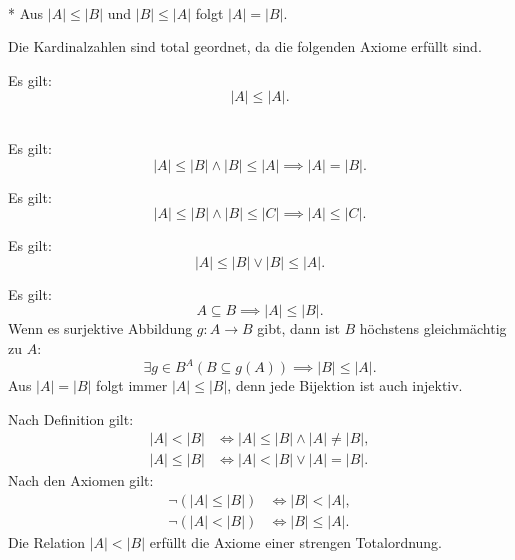 \begin{Satz}\mbox{}\\*
Aus $|A|\le |B|$ und $|B|\le |A|$ folgt $|A|=|B|$.
\end{Satz}

\noindent
{}
Die Kardinalzahlen sind total geordnet, da die folgenden Axiome
erfüllt sind.

 Es gilt:
\begin{equation}
|A|\le |A|.
\end{equation}

\\
\indent Es gilt:
\begin{equation}
|A|\le |B| \land |B|\le |A|\implies |A|=|B|.
\end{equation}

 Es gilt:
\begin{equation}
|A|\le |B| \land |B|\le |C|\implies |A|\le |C|.
\end{equation}

 Es gilt:
\begin{equation}
|A|\le |B| \lor |B|\le |A|.
\end{equation}

\newpage
\noindent
{}

\noindent
Es gilt:
\begin{equation}
A\subseteq B \implies |A|\le |B|.
\end{equation}
Wenn es surjektive Abbildung $g\colon A\to B$ gibt,
dann ist $B$ höchstens gleichmächtig zu $A$:
\begin{equation}
\exists g{\in}B^A (B\subseteq g(A))\implies |B|\le |A|.
\end{equation}
Aus $|A|=|B|$ folgt immer $|A|\le |B|$, denn jede Bijektion
ist auch injektiv.

Nach Definition gilt:
\begin{align}
|A|<|B| &\iff |A|\le |B|\land |A|\ne |B|,\\
|A|\le |B| &\iff |A|<|B|\lor |A|=|B|.
\end{align}
Nach den Axiomen gilt:
\begin{align}
\neg (|A|\le |B|) &\iff |B|<|A|,\\
\neg (|A|<|B|) &\iff |B|\le |A|.
\end{align}
Die Relation $|A|<|B|$ erfüllt die Axiome einer
strengen Totalordnung.

